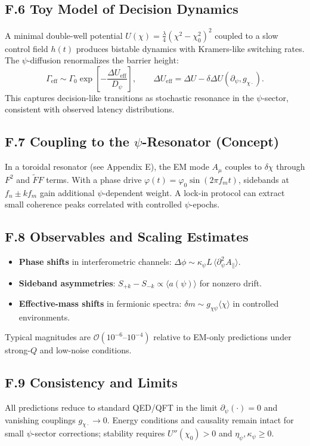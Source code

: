 \subsection*{F.6 Toy Model of Decision Dynamics}
A minimal double-well potential $U(\chi)=\tfrac{\lambda}{4}(\chi^2-\chi_0^2)^2$ coupled to a slow control field $h(t)$ produces bistable dynamics with Kramers-like switching rates. The $\psi$-diffusion renormalizes the barrier height:
\begin{equation}
\Gamma_{\mathrm{eff}} \sim \Gamma_0 \exp\!\left[-\frac{\Delta U_{\mathrm{eff}}}{D_\psi}\right],\qquad \Delta U_{\mathrm{eff}}=\Delta U - \delta\Delta U(\partial_\psi, g_{\chi\cdot}).
\end{equation}
This captures decision-like transitions as stochastic resonance in the $\psi$-sector, consistent with observed latency distributions.

\subsection*{F.7 Coupling to the $\psi$-Resonator (Concept)}
In a toroidal resonator (see Appendix E), the EM mode $A_\mu$ couples to $\delta\chi$ through $F^2$ and $\tilde F F$ terms. With a phase drive $\varphi(t)=\varphi_0\sin(2\pi f_m t)$, sidebands at $f_n\pm k f_m$ gain additional $\psi$-dependent weight. A lock-in protocol can extract small coherence peaks correlated with controlled $\psi$-epochs.

\subsection*{F.8 Observables and Scaling Estimates}
\begin{itemize}
\item \textbf{Phase shifts} in interferometric channels: $\Delta\phi \sim \kappa_\psi L\, \langle \partial_\psi^2 A_\parallel\rangle$.
\item \textbf{Sideband asymmetries}: $S_{+k}-S_{-k} \propto \langle a(\psi)\rangle$ for nonzero drift.
\item \textbf{Effective-mass shifts} in fermionic spectra: $\delta m \sim g_{\chi\psi}\langle \chi\rangle$ in controlled environments.
\end{itemize}
Typical magnitudes are $\mathcal{O}(10^{-6}\text{--}10^{-4})$ relative to EM-only predictions under strong-$Q$ and low-noise conditions.

\subsection*{F.9 Consistency and Limits}
All predictions reduce to standard QED/QFT in the limit $\partial_\psi(\cdot)=0$ and vanishing couplings $g_{\chi\cdot}\rightarrow 0$. Energy conditions and causality remain intact for small $\psi$-sector corrections; stability requires $U''(\chi_0)>0$ and $\eta_\psi,\kappa_\psi\ge 0$.

